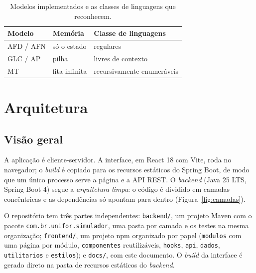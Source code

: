 \documentclass[12pt,a4paper]{article}
\newcommand{\cod}[1]{\texttt{#1}}
\begin{document}
\begin{table}[htbp]
  \centering
  \caption{Modelos implementados e as classes de linguagens que reconhecem.}
  \label{tab:chomsky}
  \small
  \begin{tabular}{lll}
    \toprule
    Modelo & Memória & Classe de linguagens \\
    \midrule
    AFD / AFN & só o estado & regulares \\
    GLC / AP  & pilha       & livres de contexto \\
    MT        & fita infinita & recursivamente enumeráveis \\
    \bottomrule
  \end{tabular}
\end{table}

\section{Arquitetura}
\label{sec:arquitetura}

\subsection{Visão geral}

A aplicação é cliente-servidor. A interface, em React 18 com Vite, roda no
navegador; o \textit{build} é copiado para os recursos estáticos do Spring
Boot, de modo que um único processo serve a página e a API REST. O
\textit{backend} (Java 25 LTS, Spring Boot 4) segue a \emph{arquitetura
limpa}: o código é dividido em camadas concêntricas e as dependências só
apontam para dentro (Figura~\ref{fig:camadas}).

O repositório tem três partes independentes: \cod{backend/}, um projeto Maven
com o pacote \cod{com.br.unifor.simulador}, uma pasta por camada e os testes na
mesma organização; \cod{frontend/}, um projeto npm organizado por papel
(\cod{modulos} com uma página por módulo, \cod{componentes} reutilizáveis,
\cod{hooks}, \cod{api}, \cod{dados}, \cod{utilitarios} e \cod{estilos}); e
\cod{docs/}, com este documento. O \textit{build} da interface é gerado direto
na pasta de recursos estáticos do \textit{backend}.
\end{document}
